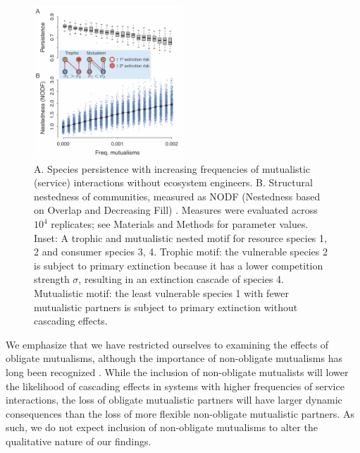 \documentclass[twocolumn,preprintnumbers,amsmath,amssymb,superscriptaddress]{revtex4}
\begin{document}
\begin{figure}[h!]
\centering
\includegraphics[width=0.5\textwidth]{fig_nested2.png}
\vspace{-8mm}
\caption{
A. Species persistence with increasing frequencies of mutualistic (service) interactions without ecosystem engineers.
B. Structural nestedness of communities, measured as NODF (Nestedness based on Overlap and Decreasing Fill) \cite{AlmeidaNeto2008}.
Measures were evaluated across $10^4$ replicates; see Materials and Methods for parameter values.
Inset: A trophic and mutualistic nested motif for resource species 1, 2 and consumer species 3, 4.
Trophic motif: the vulnerable species 2 is subject to primary extinction because it has a lower competition strength $\sigma$, resulting in an extinction cascade of species 4.
Mutualistic motif: the least vulnerable species 1 with fewer mutualistic partners is subject to primary extinction without cascading effects.
\vspace{-6mm}
}
\label{fig:nest}
\end{figure}


We emphasize that we have restricted ourselves to examining the effects of obligate mutualisms, although the importance of non-obligate mutualisms has long been recognized \cite{Ramos2012,Vieira2015,Valdovinos2016,Ponisio2017,Valdovinos2019}.
While the inclusion of non-obligate mutualists will lower the likelihood of cascading effects in systems with higher frequencies of service interactions, the loss of obligate mutualistic partners will have larger dynamic consequences than the loss of more flexible non-obligate mutualistic partners.
As such, we do not expect inclusion of non-obligate mutualisms to alter the qualitative nature of our findings.\\
\end{document}
